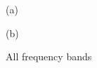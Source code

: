 \begin{figure}[h!]
\begin{minipage}[h]{0.49\linewidth}
 (a) \\
\end{minipage}
\hfill
\begin{minipage}[h]{0.5\linewidth}
 (b) \\
\end{minipage}
\caption{All frequency bands} 
\end{figure}

